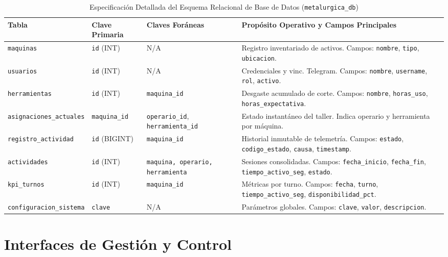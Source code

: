 \documentclass[11pt,a4paper]{article}
\begin{document}
\begin{table}[htbp]
\caption{Especificación Detallada del Esquema Relacional de Base de Datos (\texttt{metalurgica\_db})}
\label{tab:esquema_bd}
\centering
\small
\begin{tabular}{lllp{6.8cm}}
\toprule
\textbf{Tabla} & \textbf{Clave Primaria} & \textbf{Claves Foráneas} & \textbf{Propósito Operativo y Campos Principales} \\
\midrule
\texttt{maquinas} & \texttt{id} (INT) & N/A & Registro inventariado de activos. Campos: \texttt{nombre}, \texttt{tipo}, \texttt{ubicacion}. \\
\addlinespace
\texttt{usuarios} & \texttt{id} (INT) & N/A & Credenciales y vinc. Telegram. Campos: \texttt{nombre}, \texttt{username}, \texttt{rol}, \texttt{activo}. \\
\addlinespace
\texttt{herramientas} & \texttt{id} (INT) & \texttt{maquina\_id} & Desgaste acumulado de corte. Campos: \texttt{nombre}, \texttt{horas\_uso}, \texttt{horas\_expectativa}. \\
\addlinespace
\texttt{asignaciones\_actuales} & \texttt{maquina\_id} & \texttt{operario\_id}, \texttt{herramienta\_id} & Estado instantáneo del taller. Indica operario y herramienta por máquina. \\
\addlinespace
\texttt{registro\_actividad} & \texttt{id} (BIGINT) & \texttt{maquina\_id} & Historial inmutable de telemetría. Campos: \texttt{estado}, \texttt{codigo\_estado}, \texttt{causa}, \texttt{timestamp}. \\
\addlinespace
\texttt{actividades} & \texttt{id} (INT) & \texttt{maquina, operario, herramienta} & Sesiones consolidadas. Campos: \texttt{fecha\_inicio}, \texttt{fecha\_fin}, \texttt{tiempo\_activo\_seg}, \texttt{estado}. \\
\addlinespace
\texttt{kpi\_turnos} & \texttt{id} (INT) & \texttt{maquina\_id} & Métricas por turno. Campos: \texttt{fecha}, \texttt{turno}, \texttt{tiempo\_activo\_seg}, \texttt{disponibilidad\_pct}. \\
\addlinespace
\texttt{configuracion\_sistema} & \texttt{clave} & N/A & Parámetros globales. Campos: \texttt{clave}, \texttt{valor}, \texttt{descripcion}. \\
\bottomrule
\end{tabular}
\end{table}

\section{Interfaces de Gestión y Control}
\end{document}
